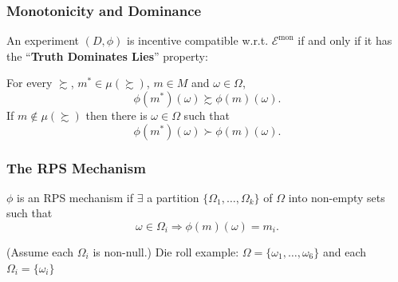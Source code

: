 %
%
%
%
%
%
%



\begin{frame}
  \frametitle{Monotonicity and Dominance}
\begin{lemma}
An experiment $(D,\phi)$ is incentive compatible w.r.t. $\mathcal{E}^\mathrm{mon}$ if and only if it has the ``\textbf{Truth Dominates Lies}'' property:

\bigskip

For every $\succsim$, $m^*\in \mu(\succsim)$, $m\in M$ and $\omega\in \Omega$,
$$\phi(m^*)(\omega) \succsim \phi(m)(\omega).$$
If $m\not\in \mu(\succsim)$ then there is $\omega\in \Omega$ such that
$$\phi(m^*)(\omega) \succ \phi(m)(\omega).$$
\end{lemma}

\end{frame}


\begin{frame}
  \frametitle{The RPS Mechanism}

\begin{definition}
    $\phi$ is an RPS mechanism if $\exists$ a partition $\{\Omega_1,\ldots,\Omega_k\}$ of $\Omega$ into non-empty sets such that
    $$
        \omega\in \Omega_i \Rightarrow \phi(m)(\omega) = m_i.
    $$
\end{definition}

\bigskip

(Assume each $\Omega_i$ is non-null.)
\br
Die roll example: $\Omega=\{\omega_1,\ldots,\omega_6\}$ and each $\Omega_i=\{\omega_i\}$
\end{frame}


